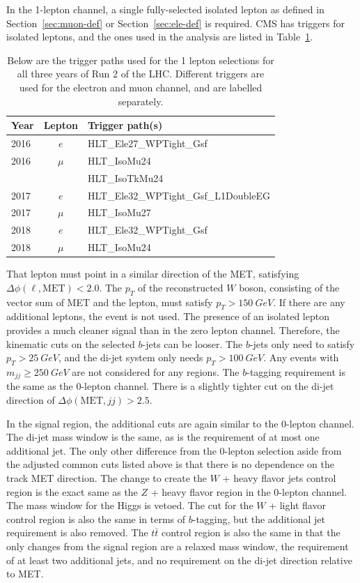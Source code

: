 In the 1-lepton channel, a single fully-selected isolated lepton as defined in
Section~\ref{sec:muon-def} or Section~\ref{sec:ele-def} is required.
CMS has triggers for isolated leptons,
and the ones used in the analysis are listed in Table~\ref{tab:1-triggers}.
\begin{table}
  \centering
  \caption[Triggers for the 1 lepton selections]{
    Below are the trigger paths used for the 1 lepton selections
    for all three years of Run 2 of the LHC.
    Different triggers are used for the electron and muon channel,
    and are labelled separately.
  }
  \begin{tabular}{|l|c|l|}
    \hline
    Year & Lepton & Trigger path(s) \\
    \hline
    2016 & $e$ & HLT\_Ele27\_WPTight\_Gsf \\
    \hline
    2016 & $\mu$ & HLT\_IsoMu24 \\
    & & HLT\_IsoTkMu24 \\
    \hline
    2017 & $e$ & HLT\_Ele32\_WPTight\_Gsf\_L1DoubleEG \\
    \hline
    2017 & $\mu$ & HLT\_IsoMu27 \\
    \hline
    2018 & $e$ & HLT\_Ele32\_WPTight\_Gsf \\
    \hline
    2018 & $\mu$ & HLT\_IsoMu24 \\
    \hline
  \end{tabular}
  \label{tab:1-triggers}
\end{table}
That lepton must point in a similar direction of the MET,
satisfying $\Delta \phi(\ell, \mathrm{MET}) < 2.0$.
The $p_T$ of the reconstructed $W$ boson, consisting of the vector sum of MET and the lepton,
must satisfy $p_T > \SI{150}{GeV}$.
If there are any additional leptons, the event is not used.
The presence of an isolated lepton provides
a much cleaner signal than in the zero lepton channel.
Therefore, the kinematic cuts on the selected $b$-jets can be looser.
The $b$-jets only need to satisfy $p_T > \SI{25}{GeV}$,
and the di-jet system only needs $p_T > \SI{100}{GeV}$.
Any events with $m_{jj} \ge \SI{250}{GeV}$ are not considered for any regions.
The $b$-tagging requirement is the same as the 0-lepton channel.
There is a slightly tighter cut on the di-jet direction of
$\Delta\phi(\mathrm{MET}, jj) > 2.5$.

In the signal region, the additional cuts are again similar to the 0-lepton channel.
The di-jet mass window is the same, as is the requirement of at most one additional jet.
The only other difference from the 0-lepton selection
aside from the adjusted common cuts listed above
is that there is no dependence on the track MET direction.
The change to create the $W$ + heavy flavor jets control region is the exact same as the
$Z$ + heavy flavor region in the 0-lepton channel.
The mass window for the Higgs is vetoed.
The cut for the $W$ + light flavor control region is also the same in terms of $b$-tagging,
but the additional jet requirement is also removed.
The $t\bar{t}$ control region is also the same in that
the only changes from the signal region
are a relaxed mass window, the requirement of at least two additional jets,
and no requirement on the di-jet direction relative to MET.

